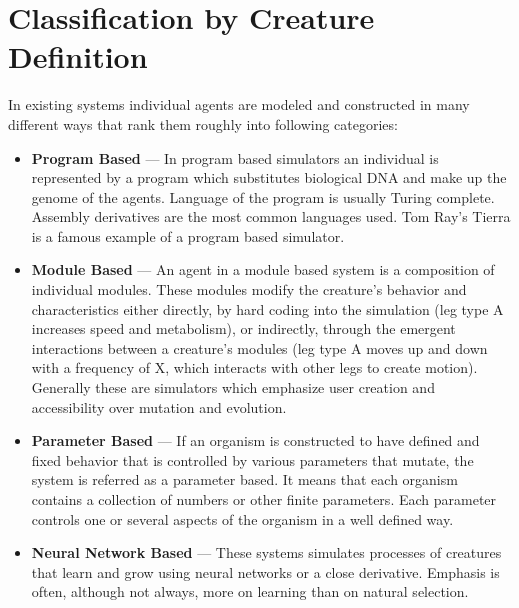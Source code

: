 \documentclass[a4paper,12pt]{report}
\begin{document}
\section{Classification by Creature Definition}
In existing systems individual agents are modeled and constructed in many different ways that rank them roughly into following categories:
\begin{itemize}
    \item \textbf{Program Based} --- In program based simulators an individual is represented by a program which substitutes biological DNA and make up the genome of the agents. Language of the program is usually Turing complete. Assembly derivatives are the most common languages used. Tom Ray's Tierra is a famous example of a program based simulator.
    \item \textbf{Module Based} --- An agent in a module based system is a composition of individual modules. These modules modify the creature's behavior and characteristics either directly, by hard coding into the simulation (leg type A increases speed and metabolism), or indirectly, through the emergent interactions between a creature's modules (leg type A moves up and down with a frequency of X, which interacts with other legs to create motion). Generally these are simulators which emphasize user creation and accessibility over mutation and evolution.  
    \item \textbf{Parameter Based} --- If an organism is constructed to have defined and fixed behavior that is controlled by various parameters that mutate, the system is referred as a parameter based. It means that each organism contains a collection of numbers or other finite parameters. Each parameter controls one or several aspects of the organism in a well defined way.
    \item \textbf{Neural Network Based} --- These systems simulates processes of  creatures that learn and grow using neural networks or a close derivative. Emphasis is often, although not always, more on learning than on natural selection.
\end{itemize}
\end{document}
